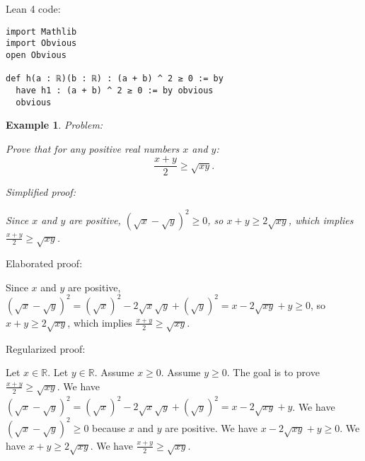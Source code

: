 \documentclass{article}
\newtheorem{example}{Example}
\begin{document}
Lean 4 code:
\begin{tcolorbox}[colback=white!10, width=\linewidth]
\begin{lstlisting}[language=Lean4]
import Mathlib
import Obvious
open Obvious

def h(a : ℝ)(b : ℝ) : (a + b) ^ 2 ≥ 0 := by
  have h1 : (a + b) ^ 2 ≥ 0 := by obvious
  obvious

\end{lstlisting}
\end{tcolorbox}


\begin{example}
Problem:
\begin{tcolorbox}[colback=yellow!10, width=\linewidth]
Prove that for any positive real numbers $x$ and $y$:
    $$\frac{x+y}{2} \geq \sqrt{xy}.$$
\end{tcolorbox}

Simplified proof:
\begin{tcolorbox}[colback=blue!10, width=\linewidth]
Since $x$ and $y$ are positive, $(\sqrt x - \sqrt y)^2 \ge 0$, so $x+y \ge 2\sqrt{xy}$, which implies $\frac{x+y}{2} \ge \sqrt{xy}$.
\end{tcolorbox}
\end{example}

Elaborated proof:
\begin{tcolorbox}[colback=green!10, width=\linewidth]
Since $x$ and $y$ are positive, $(\sqrt x - \sqrt y)^2 = (\sqrt{x})^2 - 2\sqrt{x}\sqrt{y} + (\sqrt{y})^2= x - 2\sqrt{xy} + y \ge 0$, so $x+y \ge 2\sqrt{xy}$, which implies $\frac{x+y}{2} \ge \sqrt{xy}$.
\end{tcolorbox}

Regularized proof:
\begin{tcolorbox}[colback=red!10, width=\linewidth]
Let $x\in\mathbb{R}$. Let $y\in\mathbb{R}$.
Assume $x \ge 0$. Assume $y \ge 0$.
The goal is to prove $\frac{x+y}{2} \ge \sqrt{xy}$.
We have ${{(\sqrt x - \sqrt y)}}^2 = {{(\sqrt{x})}}^2 - 2\sqrt{x}\sqrt{y} + {{(\sqrt{y})}}^2= x - 2\sqrt{xy} + y$.
We have ${{(\sqrt x - \sqrt y)}}^2 \ge 0$ because $x$ and $y$ are positive.
We have $x - 2\sqrt{xy} + y \ge 0$.
We have $x+y \ge 2\sqrt{xy}$.
We have $\frac{x+y}{2} \ge \sqrt{xy}$.
\end{tcolorbox}
\end{document}
